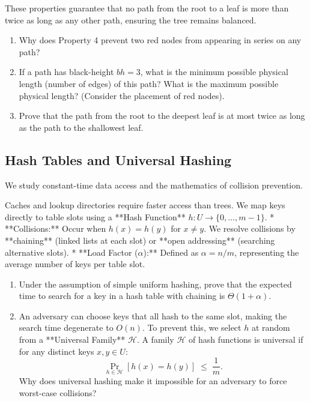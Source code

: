 \documentclass[12pt, a4paper]{book}
\begin{document}
\begin{explobox}
These properties guarantee that no path from the root to a leaf is more than twice as long as any other path, ensuring the tree remains balanced.
\begin{enumerate}[label=(\alph*), leftmargin=*]
  \item Why does Property 4 prevent two red nodes from appearing in series on any path?
  \item If a path has black-height $bh = 3$, what is the minimum possible physical length (number of edges) of this path? What is the maximum possible physical length? (Consider the placement of red nodes).
  \item Prove that the path from the root to the deepest leaf is at most twice as long as the path to the shallowest leaf.
\end{enumerate}
\end{explobox}

\subsection{Hash Tables and Universal Hashing}

We study constant-time data access and the mathematics of collision prevention.

\begin{explobox}
Caches and lookup directories require faster access than trees. We map keys directly to table slots using a **Hash Function** $h: U \to \{0, \dots, m-1\}$.
* **Collisions:** Occur when $h(x) = h(y)$ for $x \neq y$. We resolve collisions by **chaining** (linked lists at each slot) or **open addressing** (searching alternative slots).
* **Load Factor ($\alpha$):** Defined as $\alpha = n/m$, representing the average number of keys per table slot.
\begin{enumerate}[label=(\alph*), leftmargin=*]
  \item Under the assumption of simple uniform hashing, prove that the expected time to search for a key in a hash table with chaining is $\Theta(1 + \alpha)$.
  \item An adversary can choose keys that all hash to the same slot, making the search time degenerate to $O(n)$.
        To prevent this, we select $h$ at random from a **Universal Family** $\mathcal{H}$.
        A family $\mathcal{H}$ of hash functions is universal if for any distinct keys $x, y \in U$:
        \[
          \Pr_{h \in \mathcal{H}} [h(x) = h(y)] \;\le\; \frac{1}{m}.
        \]
        Why does universal hashing make it impossible for an adversary to force worst-case collisions?
\end{enumerate}
\end{explobox}
\end{document}
